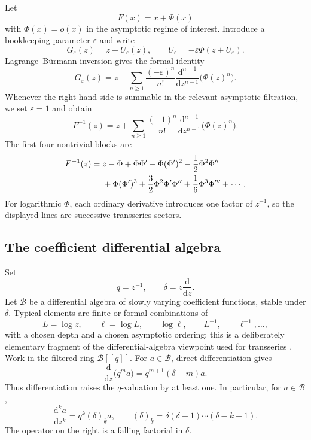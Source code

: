 \documentclass[11pt]{article}
\theoremstyle{clean}
\newcommand{\fall}[2]{\left(#1\right)_{\!\underline{#2}}}
\begin{document}
Let
\begin{equation}\label{eq:nearidentity}
  F(x)=x+\Phi(x)
\end{equation}
with \(\Phi(x)=o(x)\) in the asymptotic regime of interest.  Introduce a
bookkeeping parameter \(\varepsilon\) and write
\[
  G_\varepsilon(z)=z+U_\varepsilon(z),
  \qquad
  U_\varepsilon=-\varepsilon\Phi(z+U_\varepsilon).
\]
Lagrange--B\"urmann inversion \cite{FlajoletSedgewick,Henrici} gives the formal identity
\begin{equation}\label{eq:LB}
  G_\varepsilon(z)=z+
  \sum_{n\ge1}\frac{(-\varepsilon)^n}{n!}
  \frac{\mathrm d^{n-1}}{\mathrm dz^{n-1}}
  \bigl(\Phi(z)^n\bigr).
\end{equation}
Whenever the right-hand side is summable in the relevant asymptotic filtration,
we set \(\varepsilon=1\) and obtain
\begin{equation}\label{eq:LB1}
  \boxed{\quad
  F^{-1}(z)=z+
  \sum_{n\ge1}\frac{(-1)^n}{n!}
  \frac{\mathrm d^{n-1}}{\mathrm dz^{n-1}}
  \bigl(\Phi(z)^n\bigr).
  \quad}
\end{equation}
The first four nontrivial blocks are
\begin{align}
 F^{-1}(z)={}&z-\Phi
 +\Phi\Phi'
 -\Phi(\Phi')^2-\frac12\Phi^2\Phi'' \notag\\
 &+\Phi(\Phi')^3
 +\frac32\Phi^2\Phi'\Phi''
 +\frac16\Phi^3\Phi'''
 +\cdots.\label{eq:universalfirstterms}
\end{align}
For logarithmic \(\Phi\), each ordinary derivative introduces one factor of
\(z^{-1}\), so the displayed lines are successive transseries sectors.

\subsection{The coefficient differential algebra}

Set
\begin{equation}\label{eq:qdelta}
  q=z^{-1},
  \qquad
  \delta=z\frac{\mathrm d}{\mathrm dz}.
\end{equation}
Let \(\mathcal B\) be a differential algebra of slowly varying coefficient
functions, stable under \(\delta\).  Typical elements are finite or formal
combinations of
\[
  L=\log z,\qquad \ell=\log L,
  \qquad \log\ell,\qquad L^{-1},\qquad \ell^{-1},\ldots,
\]
with a chosen depth and a chosen asymptotic ordering; this is a deliberately elementary fragment of the differential-algebra viewpoint used for transseries \cite{vanDerHoeven}.  Work in the filtered
ring \(\mathcal B[[q]]\).  For \(a\in\mathcal B\), direct differentiation gives
\begin{equation}\label{eq:Dblock}
  \frac{\mathrm d}{\mathrm dz}\bigl(q^m a\bigr)
  =q^{m+1}(\delta-m)a.
\end{equation}
Thus differentiation raises the \(q\)-valuation by at least one.  In
particular, for \(a\in\mathcal B\),
\begin{equation}\label{eq:Dkblock}
  \frac{\mathrm d^k a}{\mathrm dz^k}
  =q^k\fall{\delta}{k}a,
  \qquad
  \fall{\delta}{k}
  =\delta(\delta-1)\cdots(\delta-k+1).
\end{equation}
The operator on the right is a falling factorial in \(\delta\).
\end{document}
